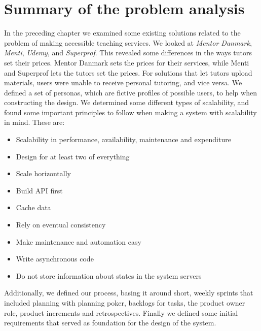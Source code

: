\section{Summary of the problem analysis}
In the preceding chapter we examined some existing solutions related to the problem of making accessible teaching services.
We looked at \textit{Mentor Danmark}, \textit{Menti}, \textit{Udemy}, and \textit{Superprof}.
This revealed some differences in the ways tutors set their prices.
Mentor Danmark sets the prices for their services, while Menti and Superprof lets the tutors set the prices.
For solutions that let tutors upload materials, users were unable to receive personal tutoring, and vice versa.
We defined a set of personas, which are fictive profiles of possible users, to help when constructing the design.
We determined some different types of scalability, and found some important principles to follow when making a system with scalability in mind.
These are:
\begin{itemize}
    \item Scalability in performance, availability, maintenance and expenditure
    \item Design for at least two of everything
    \item Scale horizontally
    \item Build API first
    \item Cache data
    \item Rely on eventual consistency
    \item Make maintenance and automation easy
    \item Write asynchronous code
    \item Do not store information about states in the system servers
\end{itemize}

Additionally, we defined our process, basing it around short, weekly sprints that included planning with planning poker, backlogs for tasks, the product owner role, product increments and retrospectives.
Finally we defined some initial requirements that served as foundation for the design of the system.